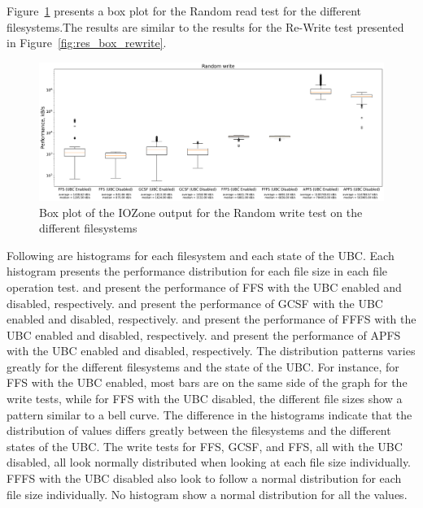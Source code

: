 \FloatBarrier

Figure~\ref{fig:res_box_rndwrite} presents a box plot for the Random read test for the different filesystems.The results are similar to the results for the \mbox{Re-Write} test presented in Figure~\ref{fig:res_box_rewrite}.

\begin{figure}
	\label{fig:res_box_rndwrite}
	\begin{center}
		\includegraphics[width=1.0\textwidth]{figures.nosync/benchmarking/Random write-boxplot.pdf}
	\end{center}
	\caption[Box plot of the IOZone output for the Random write test]{Box plot of the IOZone output for the Random write test on the different filesystems}
\end{figure}

\FloatBarrier
\clearpage

Following are histograms for each filesystem and each state of the \gls{UBC}. Each histogram presents the performance distribution for each file size in each file operation test.  and  present the performance of \gls{FFS} with the \gls{UBC} enabled and disabled, respectively.  and  present the performance of \gls{GCSF} with the \gls{UBC} enabled and disabled, respectively.  and  present the performance of \gls{FFFS} with the \gls{UBC} enabled and disabled, respectively.  and  present the performance of \gls{APFS} with the \gls{UBC} enabled and disabled, respectively. The distribution patterns varies greatly for the different filesystems and the state of the \gls{UBC}. For instance, for \gls{FFS} with the \gls{UBC} enabled, most bars are on the same side of the graph for the write tests, while for \gls{FFS} with the \gls{UBC} disabled, the different file sizes show a pattern similar to a bell curve. The difference in the histograms indicate that the distribution of values differs greatly between the filesystems and the different states of the \gls{UBC}. The write tests for \gls{FFS}, \gls{GCSF}, and \gls{FFS}, all with the \gls{UBC} disabled, all look normally distributed when looking at each file size individually. \gls{FFFS} with the \gls{UBC} disabled also look to follow a normal distribution for each file size individually. No histogram show a normal distribution for all the values.
\clearpage

